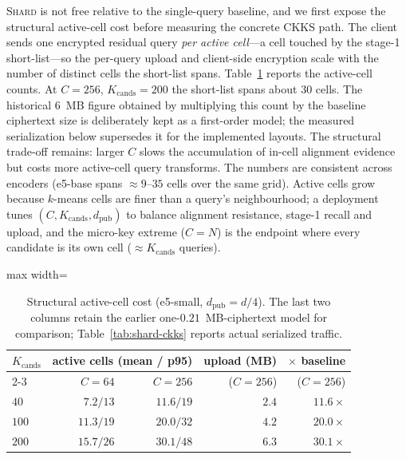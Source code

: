 \textsc{Shard} is not free relative to the single-query baseline, and we
first expose the structural active-cell cost before measuring the concrete
CKKS path. The client sends one encrypted
residual query \emph{per active cell}---a cell touched by the stage-1
short-list---so the per-query upload and client-side encryption scale with
the number of distinct cells the short-list spans. Table~\ref{tab:shard-cost}
reports the active-cell counts. At $C{=}256$, $K_{\mathrm{cands}}{=}200$ the
short-list spans about $30$ cells. The historical $6$~MB figure obtained by
multiplying this count by the baseline ciphertext size is deliberately kept
as a first-order model; the measured serialization below supersedes it for
the implemented layouts. The structural trade-off remains: larger $C$ slows the accumulation
of in-cell alignment evidence but costs more active-cell query transforms. The
numbers are consistent across encoders (e5-base spans $\approx 9$--$35$
cells over the same grid). Active cells grow because $k$-means cells are
finer than a query's neighbourhood; a deployment tunes $(C,
K_{\mathrm{cands}}, d_{\mathrm{pub}})$ to balance alignment resistance,
stage-1 recall and upload, and the micro-key extreme ($C{=}N$) is the
endpoint where every candidate is its own cell ($\approx K_{\mathrm{cands}}$
queries).

\begin{table}[tbp]
\begin{singlespace}
\centering
\caption{Structural active-cell cost (e5-small, $d_{\mathrm{pub}}=d/4$).
The last two columns retain the earlier one-$0.21$~MB-ciphertext model for
comparison; Table~\ref{tab:shard-ckks} reports actual serialized traffic.}
\label{tab:shard-cost}
\small
\begin{adjustbox}{max width=\linewidth}
\begin{tabular}{@{}lrrrr@{}}
\toprule
$K_{\mathrm{cands}}$ & \multicolumn{2}{c}{active cells (mean / p95)} & upload (MB) & $\times$ baseline\\
\cmidrule(lr){2-3}
 & $C{=}64$ & $C{=}256$ & ($C{=}256$) & ($C{=}256$)\\
\midrule
$40$  & $7.2 / 13$  & $11.6 / 19$ & $2.4$ & $11.6\times$\\
$100$ & $11.3 / 19$ & $20.0 / 32$ & $4.2$ & $20.0\times$\\
$200$ & $15.7 / 26$ & $30.1 / 48$ & $6.3$ & $30.1\times$\\
\bottomrule
\end{tabular}
\end{adjustbox}
\end{singlespace}
\end{table}

